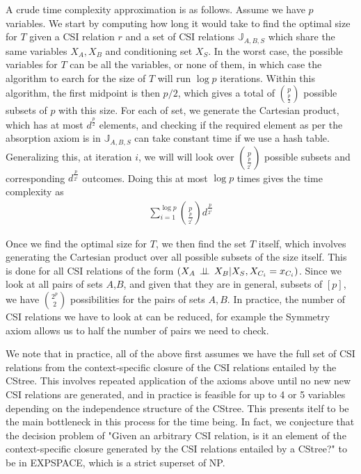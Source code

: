 \documentclass{tufte-book}
\begin{document}
A crude time complexity approximation is as follows. Assume we have \(p\) variables. We start by computing how long it would take to find the optimal size for \(T\) given a CSI relation \(r\) and a set of CSI relations \(\mathbb{J}_{A,B,S}\) which share the same variables \(X_A,X_B\) and conditioning set \(X_S\). In the worst case, the possible variables for \(T\) can be all the variables, or none of them, in which case the algorithm to earch for the size of \(T\) will run \(\log p\) iterations. Within this algorithm, the first midpoint is then \(p/2\), which gives a total of \(p\choose \frac{p}{2}\) possible subsets of \(p\) with this size. For each of set, we generate the Cartesian product, which has at most \(d^{\frac{p}{2}}\) elements, and checking if the required element as per the absorption axiom is in \(\mathbb{J}_{A,B,S}\) can take constant time if we use a hash table. Generalizing this, at iteration \(i\), we will will look over \(p \choose \frac{p}{2^i}\) possible subsets and corresponding \(d^{\frac{p}{2^i}}\) outcomes. Doing this at most \(\log p\) times gives the time complexity as
\begin{align*}
\sum_{i=1}^{\log p} {p\choose{\frac{p}{2^i}}}d^{\frac{p}{2^i}}
\end{align*}

Once we find the optimal size for \(T\), we then find the set \(T\) itself, which involves generating the Cartesian product over all possible subsets of the size itself. This is done for all CSI relations of the form \((X_A\,\perp \!\!\! \perp\,X_B|X_S,X_{C_i}=x_{C_i})\). Since we look at all pairs of sets \(A\),\(B\), and given that they are in general, subsets of \([p]\), we have \(2^p \choose 2\) possibilities for the pairs of sets \(A,B\). In practice, the number of CSI relations we have to look at can be reduced, for example the Symmetry axiom allows us to half the number of pairs we need to check.


We note that in practice, all of the above first assumes we have the full set of CSI relations from the context-specific closure of the CSI relations entailed by the CStree. This involves repeated application of the axioms above until no new new CSI relations are generated, and in practice is feasible for up to 4 or 5 variables depending on the independence structure of the CStree. This presents itelf to be the main bottleneck in this process for the time being. In fact, we conjecture that the decision problem of "Given an arbitrary CSI relation, is it an element of the context-specific closure generated by the CSI relations entailed by a CStree?" to be in EXPSPACE, which is a strict superset of NP.  
\end{document}
